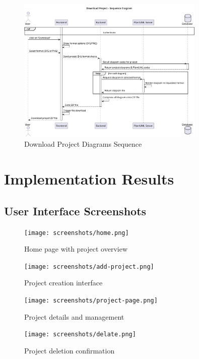 \begin{figure}[H]
\centering
\includegraphics[width=0.8\textwidth]{conception/SprintIII/sequence_diagrams/sequence_projectManagement_3_5_DownloadProjectDiagramsAsZip.png}
\caption{Download Project Diagrams Sequence}
\label{fig:seq_download_project}
\end{figure}

\section{Implementation Results}

\subsection{User Interface Screenshots}

\begin{figure}[H]
\centering
\texttt{[image: screenshots/home.png]}
\caption{Home page with project overview}
\label{fig:home_page}
\end{figure}

\begin{figure}[H]
\centering
\texttt{[image: screenshots/add-project.png]}
\caption{Project creation interface}
\label{fig:add_project}
\end{figure}

\begin{figure}[H]
\centering
\texttt{[image: screenshots/project-page.png]}
\caption{Project details and management}
\label{fig:project_page}
\end{figure}

\begin{figure}[H]
\centering
\texttt{[image: screenshots/delate.png]}
\caption{Project deletion confirmation}
\label{fig:delete_confirmation}
\end{figure}

